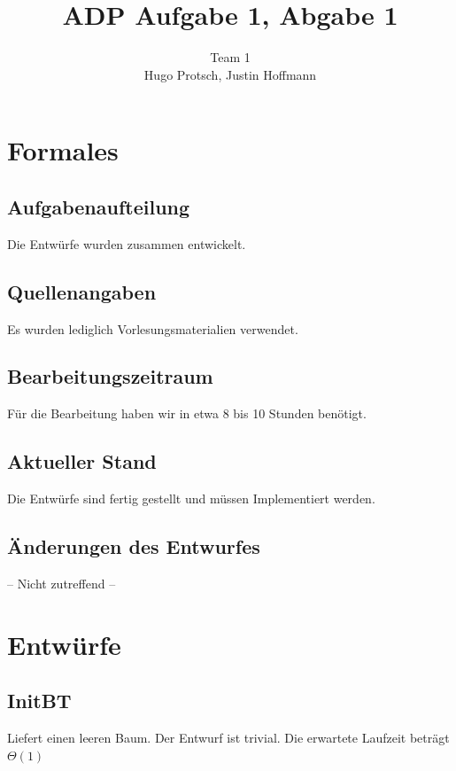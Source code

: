 \documentclass[11pt]{article}
\title{ADP Aufgabe 1, Abgabe 1}
\author{Team 1\\Hugo Protsch, Justin Hoffmann}
\begin{document}
    \maketitle


    \section{Formales}\label{sec:Formales}


    \subsection{Aufgabenaufteilung}
    Die Entwürfe wurden zusammen entwickelt.

    \subsection{Quellenangaben}
    Es wurden lediglich Vorlesungsmaterialien verwendet.


    \subsection{Bearbeitungszeitraum}
    Für die Bearbeitung haben wir in etwa 8 bis 10 Stunden benötigt.

    \subsection{Aktueller Stand}
    Die Entwürfe sind fertig gestellt und müssen Implementiert werden.


    \subsection{Änderungen des Entwurfes}
    -- Nicht zutreffend --


    \section{Entwürfe}\label{sec:entwuerfe}

    \subsection{InitBT}\label{subsec:initbt}
    Liefert einen leeren Baum.
    Der Entwurf ist trivial.
    Die erwartete Laufzeit beträgt
    \begin{math}
        \Theta(1)
    \end{math}
\end{document}
